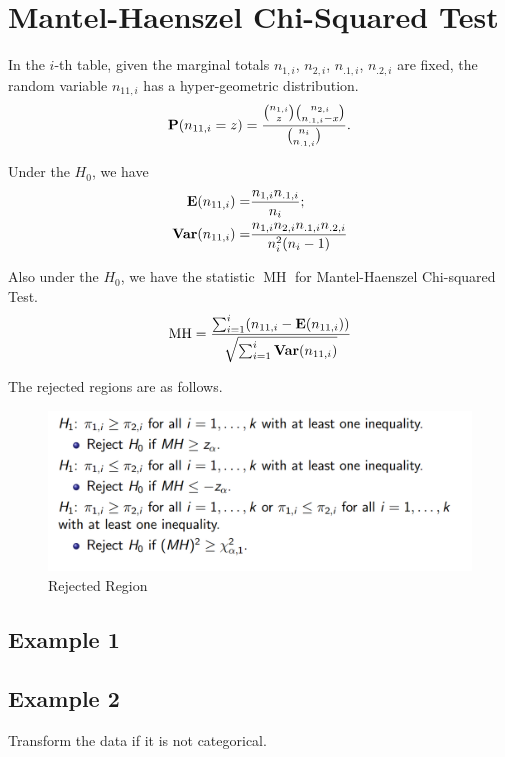 \section{Mantel-Haenszel Chi-Squared Test}
In the $i$-th table, given the marginal totals $n_{1,i}$, $n_{2,i}$, $n_{.1,i}$, $n_{.2,i}$ are fixed, the random variable $n_{11,i}$ has a hyper-geometric distribution.
\[\P(n_{11,i} = z) = \frac{{n_{1,i} \choose z} {n_{2,i} \choose n_{.1,i} - x}}{{n_i \choose n_{.1,i}}}.\]

Under the $H_0$, we have
\begin{align*}
	\E (n_{11, i}) =& \frac{n_{1,i}n_{.1,i}}{n_i};\\
	\Var (n_{11,i}) =& \frac{n_{1,i}n_{2,i}n_{.1,i}n_{.2,i}}{n_i^2 (n_i - 1)}\\
\end{align*}

Also under the $H_0$, we have the statistic $\operatorname{MH}$ for Mantel-Haenszel Chi-squared Test.
\[\operatorname{MH} = \frac{\sum_{i=1}^{i}(n_{11,i} - \E (n_{11,i}))}{\sqrt{\sum_{i=1}^{i} \Var( n_{11,i})}}\]

The rejected regions are as follows.
\begin{figure}[H]
	\centering
	\includegraphics[width=0.7\linewidth]{fig/screenshot007}
	\caption{Rejected Region}
	\label{fig:screenshot007}
\end{figure}

\subsection{Example 1}


\subsection{Example 2}
Transform the data if it is not categorical.


